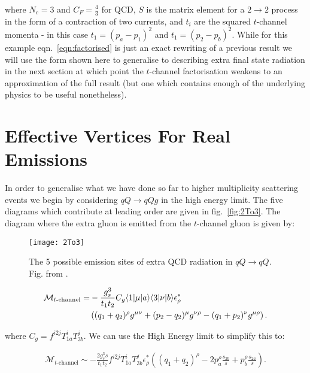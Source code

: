 		where $N_c=3$ and $C_F=\frac{4}{3}$ for QCD, $S$ is the matrix element for a $2\rightarrow2$ process
		in the form of a contraction of two currents, and $t_i$ are the squared $t$-channel momenta - in this
		case $t_1=(p_a-p_1)^2$ and $t_1=(p_2-p_b)^2$.  While for this example eqn.~\eqref{eqn:factorised} is
		just an exact rewriting of a previous result we will use the form shown here to generalise to describing extra
		final state radiation in the next section at which point the $t$-channel factorisation weakens to an
		approximation of the full result (but one which contains enough of the underlying physics to be useful
		nonetheless).

	\section{Effective Vertices For Real Emissions}
		\label{sub:effectiveVertices}

		In order to generalise what we have done so far to higher multiplicity scattering events we begin
		by considering $qQ\rightarrow qQg$ in the high energy limit.  The five diagrams which contribute at
		leading order are given in fig.~\eqref{fig:2To3}.  The diagram
		where the extra gluon is emitted from the $t$-channel gluon is given by:

		\begin{figure}[hbt]
			\begin{center}
			\texttt{[image: 2To3]}
			\caption{The 5 possible emission sites of extra QCD radiation in $qQ\rightarrow qQ$.
			Fig. from \cite{Andersen:2009nu}.}
			\label{fig:2To3}
			\end{center}
		\end{figure}

		\begin{align}
			\mathcal{M}_{t\text{-channel}} = &-\frac{g_s^3}{t_1t_2}C_g\langle 1 | \mu | a \rangle\langle 3 | \nu | b \rangle
			\epsilon^*_\rho\\&\left((q_1 + q_2)^\rho g^{\mu\nu} + (p_2 - q_2)^\mu g^{\nu\rho} - (q_1 + p_2)^\nu g^{\mu\rho}\right).
		\end{align}

		where $C_g = f^{i2j}T^i_{1a}T^j_{3b}$.  We can use the High Energy limit to simplify this to:

		\begin{align}
			\mathcal{M}_{t\text{-channel}} \sim -\frac{2g_s^3s}{t_1t_2}f^{i2j}T^i_{1a}T^j_{3b}\epsilon^*_\rho
			\left((q_1 + q_2)^\rho - 2p_a^\rho\frac{s_{2b}}{s} + p_b^\rho\frac{s_{2a}}{s}\right).
		\end{align}

